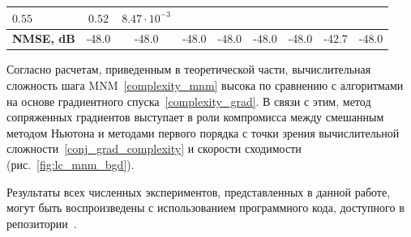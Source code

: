 \begin{table}[h!]
\begin{tabular}{|l|c|c|c|c|c|c|c|c|}
		{\color[HTML]{000000} $0.55$} &
		{\color[HTML]{000000} $0.52$} &
		{\color[HTML]{000000} $8.47\cdot10^{-3}$} \\ \hline
		\multirow{2}{*}{\textbf{NMSE, dB}} &
		\multirow{2}{*}{-48.0} &
		\multirow{2}{*}{-48.0} &
		\multirow{2}{*}{-48.0} &
		\multirow{2}{*}{-48.0} &
		\multirow{2}{*}{-48.0} &
		\multirow{2}{*}{-48.0} &
		\multirow{2}{*}{-42.7} &
		\multirow{2}{*}{-48.0} \\ 
		& & & & & & & & \\ \hline 
	\end{tabular}
	\label{tab:conj_grad_table_of_results}
\end{table}

Согласно расчетам, приведенным в теоретической части, вычислительная сложность шага MNM~\eqref{complexity_mnm} высока по сравнению с алгоритмами на основе градиентного спуска~\eqref{complexity_grad}. В связи с этим, метод сопряженных градиентов выступает в роли компромисса между смешанным методом Ньютона и методами первого порядка с точки зрения вычислительной сложности~\eqref{conj_grad_complexity} и скорости сходимости (рис.~\ref{fig:lc_mnm_bgd}).

Результаты всех численных экспериментов, представленных в данной работе, могут быть воспроизведены с использованием программного кода, доступного в репозитории~\cite{github_repo}.


